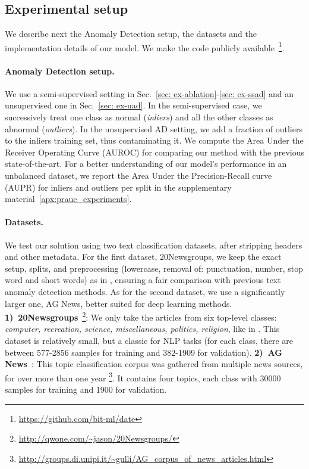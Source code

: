 \documentclass[11pt]{article}
\begin{document}
\subsection{Experimental setup}
We describe next the Anomaly Detection setup, the datasets and the implementation details of our model. We make the code publicly available~\footnote{\url{https://github.com/bit-ml/date}}.

\paragraph{Anomaly Detection setup.} We use a semi-supervised setting in Sec.~\ref{sec: ex-ablation}-\ref{sec: ex-ssad} and an unsupervised one in Sec.~\ref{sec: ex-uad}. In the semi-supervised case, we successively treat one class as normal (\emph{inliers}) and all the other classes as abnormal (\emph{outliers}). In the unsupervised AD setting, we add a fraction of outliers to the inliers training set, thus contaminating it. We compute the Area Under the Receiver Operating Curve (AUROC) for comparing our method with the previous state-of-the-art. For a better understanding of our model's performance in an unbalanced dataset, we report the Area Under the Precision-Recall curve (AUPR) for inliers and outliers per split in the supplementary material~\ref{apx:prauc_experiments}.

\paragraph{Datasets.} We test our solution using two text classification datasets, after stripping headers and other metadata. For the first dataset, 20Newsgroups, we keep the exact setup, splits, and preprocessing (lowercase, removal of: punctuation, number, stop word and short words) as in \cite{acl2019}, ensuring a fair comparison with previous text anomaly detection methods. As for the second dataset, we use a significantly larger one, AG News, better suited for deep learning methods. \textbf{1)~20Newsgroups}~\footnote{\url{http://qwone.com/~jason/20Newsgroups/}}: We only take the articles from six top-level classes: \emph{computer, recreation, science, miscellaneous, politics, religion}, like in \cite{acl2019}. This dataset is relatively small, but a classic for NLP tasks (for each class, there are between 577-2856 samples for training and 382-1909 for validation). \textbf{2)~AG News}~\cite{ag_news}: This topic classification corpus was gathered from multiple news sources, for over more than one year \footnote{\url{http://groups.di.unipi.it/~gulli/AG_corpus_of_news_articles.html}}. It contains four topics, each class with 30000 samples for training and 1900 for validation.
\end{document}
